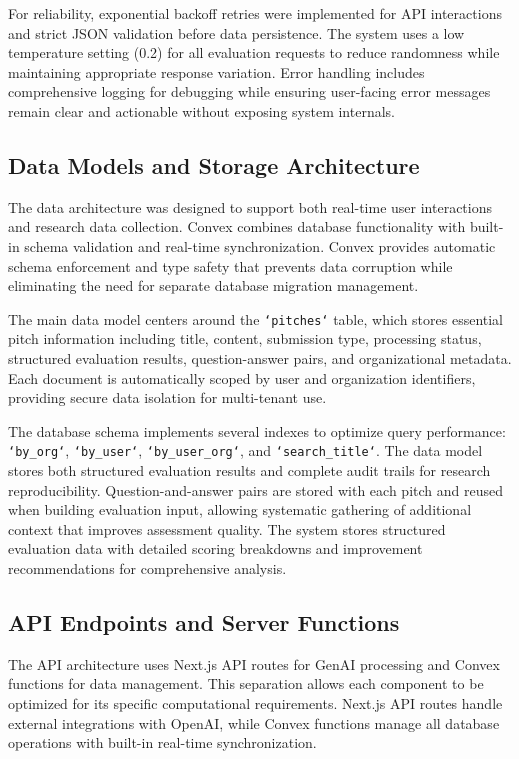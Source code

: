 For reliability, exponential backoff retries were implemented for API interactions and strict JSON validation before data persistence. The system uses a low temperature setting (0.2) for all evaluation requests to reduce randomness while maintaining appropriate response variation. Error handling includes comprehensive logging for debugging while ensuring user-facing error messages remain clear and actionable without exposing system internals.

\subsection{Data Models and Storage Architecture}\label{subsec:data-models-and-storage-architecture}

The data architecture was designed to support both real-time user interactions and research data collection. Convex combines database functionality with built-in schema validation and real-time synchronization. Convex provides automatic schema enforcement and type safety that prevents data corruption while eliminating the need for separate database migration management.

The main data model centers around the \texttt{`pitches`} table, which stores essential pitch information including title, content, submission type, processing status, structured evaluation results, question-answer pairs, and organizational metadata. Each document is automatically scoped by user and organization identifiers, providing secure data isolation for multi-tenant use.

The database schema implements several indexes to optimize query performance: \texttt{`by\_org`}, \texttt{`by\_user`}, \texttt{`by\_user\_org`}, and \texttt{`search\_title`}. The data model stores both structured evaluation results and complete audit trails for research reproducibility. Question-and-answer pairs are stored with each pitch and reused when building evaluation input, allowing systematic gathering of additional context that improves assessment quality. The system stores structured evaluation data with detailed scoring breakdowns and improvement recommendations for comprehensive analysis.

\subsection{API Endpoints and Server Functions}\label{subsec:api-and-server}

The API architecture uses Next.js API routes for GenAI processing and Convex functions for data management. This separation allows each component to be optimized for its specific computational requirements. Next.js API routes handle external integrations with OpenAI, while Convex functions manage all database operations with built-in real-time synchronization.

